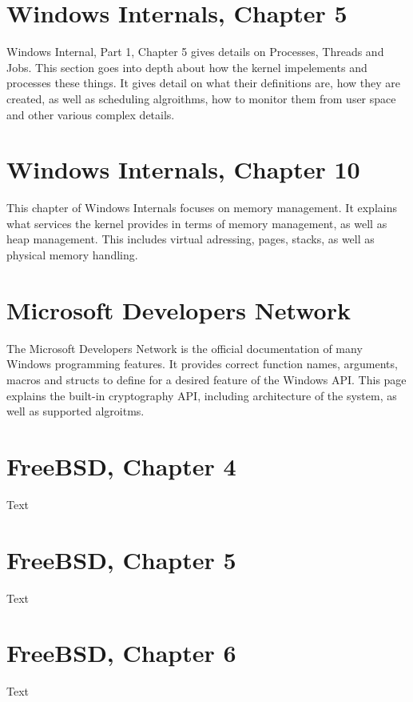 \documentclass[titlepage]{article}
\begin{document}
\section{Windows Internals, Chapter 5}
\begin{singlespace}
    \cite{windowsch5}Windows Internal, Part 1, Chapter 5 gives details on Processes, Threads and Jobs. This section goes into depth about how the kernel impelements and processes these things. It gives detail on what their definitions are, how they are created, as well as scheduling algroithms, how to monitor them from user space and other various complex details.
\end{singlespace}

\section{Windows Internals, Chapter 10}
\begin{singlespace}
    \cite{windowsch10}This chapter of Windows Internals focuses on memory management. It explains what services the kernel provides in terms of memory management, as well as heap management. This includes virtual adressing, pages, stacks, as well as physical memory handling.
\end{singlespace}

\section{Microsoft Developers Network}
\begin{singlespace}
    \cite{msdn}The Microsoft Developers Network is the official documentation of many Windows programming features. It provides correct function names, arguments, macros and structs to define for a desired feature of the Windows API. This page explains the built-in cryptography API, including architecture of the system, as well as supported algroitms.
\end{singlespace}

\section{FreeBSD, Chapter 4}
\begin{singlespace}
    \cite{freebsdch4}Text
\end{singlespace}

\section{FreeBSD, Chapter 5}
\begin{singlespace}
    \cite{freebsdch5}Text
\end{singlespace}

\section{FreeBSD, Chapter 6}
\begin{singlespace}
    \cite{freebsdch6}Text
\end{singlespace}

\newpage


\end{document}
